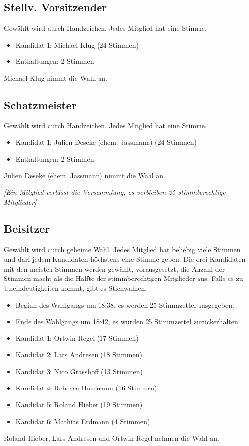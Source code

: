 \documentclass[a4paper,12pt]{scrartcl}
\begin{document}
\subsection{Stellv. Vorsitzender}
Gewählt wird durch Handzeichen. Jedes Mitglied hat eine Stimme.
\begin{itemize}
  \item Kandidat 1: Michael Klug (24 Stimmen)
  \item Enthaltungen: 2 Stimmen
\end{itemize}
Michael Klug nimmt die Wahl an.

\newpage

\subsection{Schatzmeister}
Gewählt wird durch Handzeichen. Jedes Mitglied hat eine Stimme.
\begin{itemize}
  \item Kandidat 1: Julien Deseke (ehem. Jassmann) (24 Stimmen)
  \item Enthaltungen: 2 Stimmen
\end{itemize}
Julien Deseke (ehem. Jassmann) nimmt die Wahl an.

\emph{[Ein Mitglied verlässt die Versammlung, es verbleiben 25 stimmberechtige
Mitglieder]}

\subsection{Beisitzer}
Gewählt wird durch geheime Wahl. Jedes Mitglied hat beliebig viele Stimmen und
darf jedem Kandidaten höchstens eine Stimme geben. Die drei Kandidaten mit den
meisten Stimmen werden gewählt, vorausgesetzt, die Anzahl der Stimmen macht als
die Hälfte der stimmberechtigen Mitglieder aus. Falls es zu Uneindeutigkeiten
kommt, gibt es Stichwahlen.

\begin{itemize}
  \item Beginn des Wahlgangs um 18:38, es werden 25 Stimmzettel ausgegeben.
  \item Ende des Wahlgangs um 18:42, es wurden 25 Stimmzettel zurückerhalten.
  \item Kandidat 1: Ortwin Regel (17 Stimmen)
  \item Kandidat 2: Lars Andresen (18 Stimmen)
  \item Kandidat 3: Nico Grasshoff (13 Stimmen)
  \item Kandidat 4: Rebecca Husemann (16 Stimmen)
  \item Kandidat 5: Roland Hieber (19 Stimmen)
  \item Kandidat 6: Mathias Erdmann (4 Stimmen)
\end{itemize}
Roland Hieber, Lars Andresen und Ortwin Regel nehmen die Wahl an.
\end{document}
